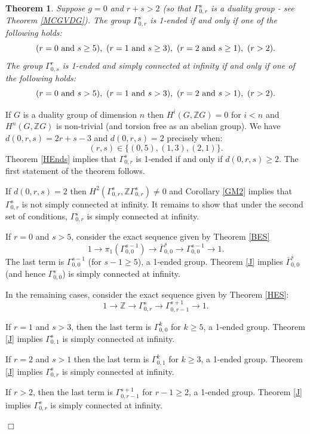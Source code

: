 \documentclass[12pt]{article}
\newtheorem{theorem}{Theorem}[subsection]
\newenvironment{proof}{\addvspace{12pt}\noindent{\bf Proof:}}{
$\Box$\par\addvspace{12pt}}
\begin{document}
\begin{theorem}\label{MCG7}
Suppose $g=0$ and $r+s>2$ (so that $\Gamma_{0,r}^s$ is a duality group - see Theorem \ref{MCGVDG}). The group $\Gamma_{0,r}^s$ is 1-ended if and only if one of the following holds: 
$$(r=0 \hbox{ and } s \geq 5),\  (r=1 \hbox{ and } s\geq 3),\   (r=2 \hbox{ and } s\geq 1), \  (r>2).$$
The group $\Gamma_{0,s}^r$ is 1-ended and simply connected at infinity if and only if one of the following holds:
$$(r=0 \hbox{ and } s>5),\ (r=1 \hbox{ and } s>3),\  (r=2 \hbox{ and } s>1),\  (r>2).$$
\end{theorem}
\begin{proof}
If $G$ is a duality group of dimension $n$ then $H^i(G,\mathbb ZG)=0$ for $i<n$ and $H^n(G,\mathbb ZG)$ is non-trivial (and torsion free as an abelian group). We have $d(0,r,s)=2r+s-3$ and $d(0,r,s)=2$ precisely when:
$$(r,s)\in \{(0,5), (1,3), (2,1)\}.$$
Theorem \ref{HEnds} implies that $\Gamma _{0,r}^s$ is 1-ended if and only if $d(0,r,s)\geq 2$. 
The first statement of the theorem follows. 

 If $d(0,r,s)=2$ then $H^2(\Gamma_{0,r}^s, \mathbb Z\Gamma_{0,r}^s)\ne 0$ and Corollary \ref{GM2} implies that $\Gamma_{0,r}^s$ is not simply connected at infinity. It remains to show that under the second set of conditions, $\Gamma_{0,r}^s$ is simply connected at infinity. 

If $r=0$ and $s>5$, consider the exact sequence given by Theorem \ref{BES}
$$1\to \pi_1(\Gamma_{0,0}^{s-1})\to \bar \Gamma_{0,0}^{s}\to \Gamma _{0,0}^{s-1}\to 1.$$
The last term is $\Gamma_{0,0}^{s-1}$ (for $s-1\geq 5$), a 1-ended group. Theorem \ref{J} implies $\bar\Gamma_{0,0}^s$ (and hence $\Gamma_{0,0}^s$) is simply connected at infinity. 

In the remaining cases, consider the exact sequence given by Theorem \ref{HES}:
$$1\to \mathbb Z\to \Gamma_{0,r}^s\to \Gamma_{0,r-1}^{s+1}\to 1.$$

If $r=1$ and $s>3$, then the last term is $\Gamma_{0,0}^k$ for $k\geq 5$, a 1-ended group. Theorem \ref{J} implies $\Gamma_{0,1}^s$ is simply connected at infinity. 

If $r=2$ and $s>1$ then the last term is $\Gamma_{0,1}^k$ for $k\geq 3$, a 1-ended group. Theorem \ref{J} implies $\Gamma_{0,r}^s$ is simply connected at infinity. 

If $r>2$, then the last term is $\Gamma_{0,r-1}^{s+1}$ for $r-1\geq 2$, a 1-ended group. Theorem \ref{J} implies $\Gamma_{0,r}^s$ is simply connected at infinity. 
\end{proof}
\end{document}
